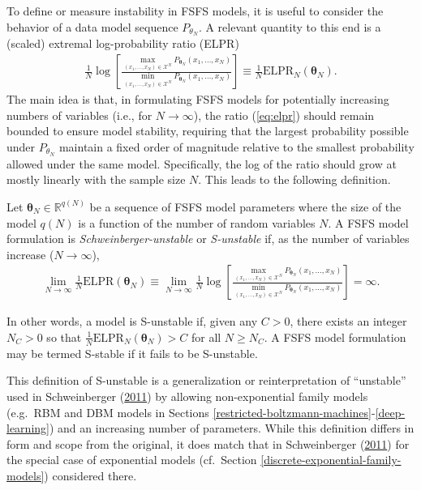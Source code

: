 \documentclass[12pt]{article}
\theoremstyle{definition}
\let\BeginKnitrBlock\begin \let\EndKnitrBlock\end
\begin{document}
To define or measure instability in FSFS models, it is useful to
consider the behavior of a data model sequence \(P_{\theta_N}\). A
relevant quantity to this end is a (scaled) extremal log-probability
ratio (ELPR)
\begin{align}
\frac{1}{N} \log \left[\frac{\max\limits_{(x_1, \dots, x_N) \in \mathcal{X}^N}P_{\boldsymbol \theta_N}(x_1, \dots, x_N)}{\min\limits_{(x_1, \dots, x_N) \in \mathcal{X}^N}P_{\boldsymbol \theta_N}(x_1, \dots, x_N)}\right] \equiv \frac{1}{N} \text{ELPR}_N(\boldsymbol \theta_N). \label{eq:elpr}
\end{align}
The main idea is that, in formulating FSFS models for potentially
increasing numbers of variables (i.e., for \(N \rightarrow \infty\)),
the ratio (\eqref{eq:elpr}) should remain bounded to ensure model
stability, requiring that the largest probability possible under
\(P_{\theta_N}\) maintain a fixed order of magnitude relative to the
smallest probability allowed under the same model. Specifically, the log
of the ratio should grow at mostly linearly with the sample size \(N\).
This leads to the following definition.
\BeginKnitrBlock{definition}[S-unstable FSFS]
\protect\hypertarget{def:instabFSFS}{}{\label{def:instabFSFS}
\iffalse (S-unstable FSFS) \fi{} }Let
\(\boldsymbol \theta_N \in \mathbb{R}^{q(N)}\) be a sequence of FSFS
model parameters where the size of the model \(q(N)\) is a function of
the number of random variables \(N\). A FSFS model formulation is
\emph{Schweinberger-unstable} or \emph{S-unstable} if, as the number of
variables increase (\(N \rightarrow \infty\)),
\begin{align*}
\lim\limits_{N \rightarrow \infty} \frac{1}{N} \text{ELPR}(\boldsymbol \theta_N) \equiv \lim\limits_{N \rightarrow \infty} \frac{1}{N} \log \left[\frac{\max\limits_{(x_1, \dots, x_N) \in \mathcal{X}^N}P_{\boldsymbol \theta_N}(x_1, \dots, x_N)}{\min\limits_{(x_1, \dots, x_N) \in \mathcal{X}^N}P_{\boldsymbol \theta_N}(x_1, \dots, x_N)}\right] = \infty.
\end{align*}
\EndKnitrBlock{definition} In other words, a model is S-unstable if,
given any \(C > 0\), there exists an integer \(N_C > 0\) so that
\(\frac{1}{N}\text{ELPR}_N(\boldsymbol \theta_N) > C\) for all
\(N \ge N_C\). A FSFS model formulation may be termed S-stable if it
fails to be S-unstable.

This definition of S-unstable is a generalization or reinterpretation of
``unstable'' used in Schweinberger
(\protect\hyperlink{ref-schweinberger2011instability}{2011}) by allowing
non-exponential family models (e.g.~RBM and DBM models in Sections
\ref{restricted-boltzmann-machines}-\ref{deep-learning}) and an
increasing number of parameters. While this definition differs in form
and scope from the original, it does match that in Schweinberger
(\protect\hyperlink{ref-schweinberger2011instability}{2011}) for the
special case of exponential models (cf.~Section
\ref{discrete-exponential-family-models}) considered there.
\end{document}
